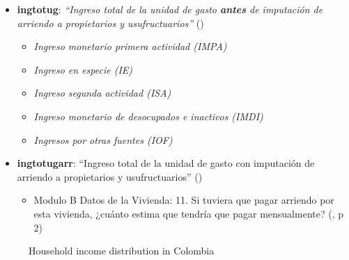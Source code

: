 \documentclass[
  ignorenonframetext,
]{beamer}
\providecommand{\tightlist}{%
  \setlength{\itemsep}{0pt}\setlength{\parskip}{0pt}}\usepackage{longtable,booktabs,array}
\begin{document}
\begin{frame}{}
\label{section-5}
\begin{itemize}
\item
  \textbf{ingtotug}: \emph{``Ingreso total de la unidad de gasto
  \textbf{antes} de imputación de arriendo a propietarios y
  usufructuarios''} ()

  \begin{itemize}
  \tightlist
  \item
    \emph{Ingreso monetario primera actividad (IMPA)}
  \item
    \emph{Ingreso en especie (IE)}
  \item
    \emph{Ingreso segunda actividad (ISA)}
  \item
    \emph{Ingreso monetario de desocupados e inactivos (IMDI)}
  \item
    \emph{Ingresos por otras fuentes (IOF)}
  \end{itemize}
\item
  \textbf{ingtotugarr}: ``Ingreso total de la unidad de gasto con
  imputación de arriendo a propietarios y usufructuarios''
  ()

  \begin{itemize}
  \tightlist
  \item
    Modulo B Datos de la Vivienda: 11. Si tuviera que pagar arriendo por
    esta vivienda, ¿cuánto estima que tendría que pagar mensualmente?
    (, p 2)
  \end{itemize}
\end{itemize}
\end{frame}

\begin{frame}{}
\label{section-6}
\begin{figure}


\caption{\label{fig-household-income-col}Household income distribution
in Colombia}

\end{figure}%
\end{frame}
\end{document}
